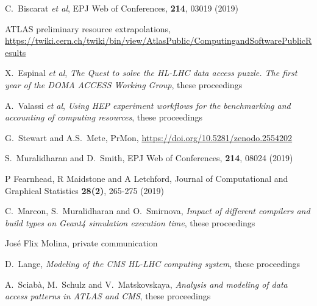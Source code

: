 \begin{thebibliography}{}

C.~Biscarat {\em et al}, EPJ Web of Conferences, \textbf{214}, 03019 (2019)

ATLAS preliminary resource extrapolations, \url{https://twiki.cern.ch/twiki/bin/view/AtlasPublic/ComputingandSoftwarePublicResults}

X.~Espinal {\em et al}, \textit{The Quest to solve the HL-LHC data access puzzle. The first year of the DOMA ACCESS Working Group}, these proceedings

A.~Valassi {\em et al}, \textit{Using HEP experiment workflows for the benchmarking and accounting of computing resources}, these proceedings

G.~Stewart and A.S.~Mete, PrMon, \url{https://doi.org/10.5281/zenodo.2554202}

S.~Muralidharan and D.~Smith, EPJ Web of Conferences, \textbf{214}, 08024 (2019)

P Fearnhead, R Maidstone and A Letchford, Journal of Computational and Graphical Statistics \textbf{28(2)}, 265-275 (2019)

C.~Marcon, S.~Muralidharan and O.~Smirnova, \textit{Impact of different compilers and build types on Geant4 simulation execution time}, these proceedings

 Jos\'e Flix Molina, private communication

D.~Lange, \textit{Modeling of the CMS HL-LHC computing system}, these proceedings

A.~Sciab\`a, M.~Schulz and V.~Matskovskaya, \textit{Analysis and modeling of data access patterns in ATLAS and CMS}, these proceedings

\end{thebibliography}
